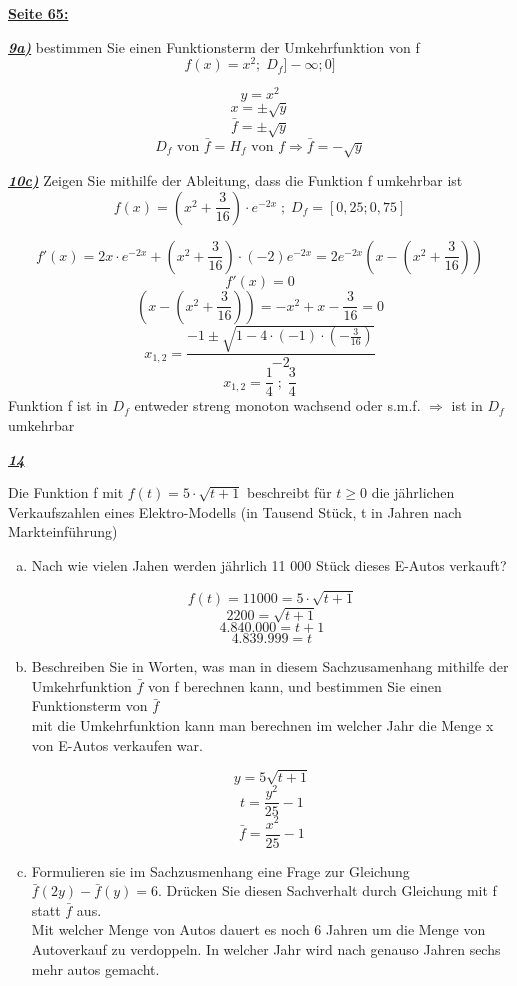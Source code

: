 \documentclass{article}
\begin{document}
\underline{\textbf{Seite 65:}}

\underline{\textit{\textbf{9a)}}}
bestimmen Sie einen Funktionsterm der Umkehrfunktion von f
\[f(x) = x^2; \; D_f ] -\infty ; 0 ]\]

\[y = x^2\]
\[x = \pm \sqrt y\]
\[\bar f = \pm \sqrt y\]
\[D_f \textrm{ von } \bar f = H_f \textrm{ von } f \Rightarrow \bar f = -\sqrt y\]

\underline{\textit{\textbf{10c)}}}
Zeigen Sie mithilfe der Ableitung, dass die Funktion f umkehrbar ist
\[f(x) = (x^2 + \frac 3 {16}) \cdot e^{-2x} \; ; \; D_f = [0,25 ; 0,75]\]

\[f'(x) = 2x \cdot e^{-2x} + (x^2 + \frac 3 {16}) \cdot (-2)e^{-2x} = 2e^{-2x} (x - (x^2 + \frac 3 {16}) )\]
\[f'(x) = 0 \]
\[(x - (x^2 + \frac 3 {16}) ) = -x^2+x - \frac 3 {16}= 0\]
\[x_{1, 2} = \frac{-1 \pm \sqrt{1-4 \cdot (-1)\cdot(- \frac 3 {16})}}{-2}\]
\[x_{1, 2} = \frac 1 4 \; ; \; \frac 34\]
Funktion f ist in $ D_f$ entweder streng monoton wachsend oder s.m.f. $\Rightarrow$ ist in $D_f$ umkehrbar

\underline{\textit{\textbf{14}}}

Die Funktion f mit $f(t) = 5 \cdot \sqrt{t+1}$ beschreibt für $t \ge 0$ die jährlichen Verkaufszahlen eines Elektro-Modells (in Tausend Stück, t in Jahren nach Markteinführung)
\begin{enumerate}[a)]

\item Nach wie vielen Jahen werden jährlich 11 000 Stück dieses E-Autos verkauft?

\[f(t) = 11 000 = 5 \cdot \sqrt{t+1}\]
\[2200 =\sqrt{t+1}\]
\[4.840.000 = t + 1\]
\[4.839.999 = t\]

\item Beschreiben Sie in Worten, was man in diesem Sachzusamenhang mithilfe der Umkehrfunktion $\bar f$ von f berechnen kann, und bestimmen Sie einen Funktionsterm von $\bar f$
\\
mit die Umkehrfunktion kann man berechnen im welcher Jahr die Menge x von E-Autos verkaufen war.

\[y = 5\sqrt{t+1}\]
\[t = \frac{y^2}{25}-1\]
\[\bar f = \frac{x^2}{25}-1\]

\item Formulieren sie im Sachzusmenhang eine Frage zur Gleichung $\bar f (2y) - \bar f (y) = 6$. Drücken Sie diesen Sachverhalt durch Gleichung mit f statt $\bar f $ aus.
\\
Mit welcher Menge von Autos dauert es noch 6 Jahren um die Menge von Autoverkauf zu verdoppeln.
In welcher Jahr wird nach genauso Jahren  sechs mehr autos gemacht.

\end{enumerate}
\end{document}
